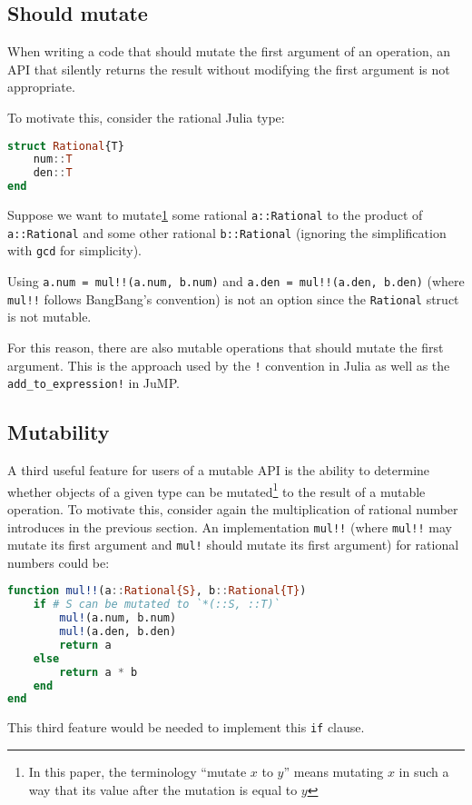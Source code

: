 \documentclass{juliacon}
\begin{document}
\subsection{Should mutate}
When writing a code that should mutate the first argument of an operation,
an API that silently returns the result without modifying the first argument is not appropriate.

To motivate this, consider the rational Julia type:
\begin{lstlisting}[language = Julia]
struct Rational{T}
    num::T
    den::T
end
\end{lstlisting}
Suppose we want to mutate\cref{foot:mutate} some rational \lstinline|a::Rational| to the
product of \lstinline|a::Rational| and some other rational \lstinline|b::Rational|
(ignoring the simplification with \lstinline|gcd| for simplicity).

Using \lstinline|a.num = mul!!(a.num, b.num)| and
\lstinline|a.den = mul!!(a.den, b.den)|
(where \lstinline|mul!!| follows BangBang's convention)
is not an option since
the \lstinline|Rational| struct is not mutable.

For this reason, there are also mutable operations that should mutate the first argument.
This is the approach used by the \lstinline|!| convention in Julia
as well as the \lstinline|add_to_expression!| in JuMP.

\subsection{Mutability}
A third useful feature for users of a mutable API is the ability to
determine whether objects of a given type can be mutated\footnote{\label{foot:mutate}In this paper, the terminology ``mutate $x$ to $y$'' means mutating $x$ in such a way that its value after the mutation is equal to $y$} to the result of a mutable operation.
To motivate this, consider again the multiplication of rational number introduces in the previous section.
An implementation \lstinline|mul!!| (where \lstinline|mul!!| may mutate its first argument and \lstinline|mul!| should mutate its first argument)
for rational numbers could be:
\begin{lstlisting}[language = Julia]
function mul!!(a::Rational{S}, b::Rational{T})
    if # S can be mutated to `*(::S, ::T)`
        mul!(a.num, b.num)
        mul!(a.den, b.den)
        return a
    else
        return a * b
    end
end
\end{lstlisting}
This third feature would be needed to implement this \lstinline|if| clause.
\end{document}
